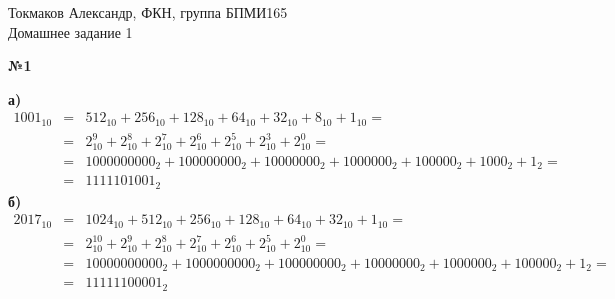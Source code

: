\documentclass{article}
\newenvironment{task}{\begin{center}\fontsize{14}{14}\selectfont\bf}{\rm\fontsize{12}{12}\selectfont\end{center}}
\begin{document}
	\begin{center}
		Токмаков Александр, ФКН, группа БПМИ165 \\
		Домашнее задание 1
	\end{center}
	
	\begin{task} 
		№1
	\end{task}
	\textbf{а)}
	\begin{eqnarray*}
	1001_{10} & = & 512_{10} + 256_{10} + 128_{10} + 64_{10} + 32_{10} + 8_{10} + 1_{10} = \\
	          & = & 2_{10}^9 + 2_{10}^8 + 2_{10}^7 + 2_{10}^6 + 2_{10}^5 + 2_{10}^3 + 2_{10}^0 = \\
	          & = & 1000000000_2 + 100000000_2 + 10000000_2 + 1000000_2 + 100000_2 + 1000_2 + 1_2 = \\
	          & = & 1111101001_2
	\end{eqnarray*}
	\textbf{б)}
	\begin{eqnarray*}
	2017_{10} & = & 1024_{10} + 512_{10} + 256_{10} + 128_{10} + 64_{10} + 32_{10} + 1_{10} = \\
	          & = & 2_{10}^{10} + 2_{10}^9 + 2_{10}^8 + 2_{10}^7 + 2_{10}^6 + 2_{10}^5 + 2_{10}^0 = \\
	          & = & 10000000000_2 + 1000000000_2 + 100000000_2 + 10000000_2 + 1000000_2 + 100000_2 + 1_2 = \\
	          & = & 11111100001_2
	\end{eqnarray*}
	
\end{document}
